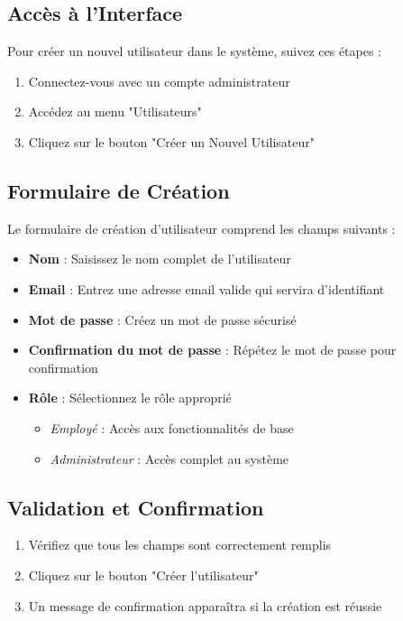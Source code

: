 \documentclass[14pt,a4paper]{report}
\begin{document}
\subsection{Accès à l'Interface}
Pour créer un nouvel utilisateur dans le système, suivez ces étapes :
\begin{enumerate}
    \item Connectez-vous avec un compte administrateur
    \item Accédez au menu "Utilisateurs"
    \item Cliquez sur le bouton "Créer un Nouvel Utilisateur"
\end{enumerate}

\subsection{Formulaire de Création}
Le formulaire de création d'utilisateur comprend les champs suivants :
\begin{itemize}
    \item \textbf{Nom} : Saisissez le nom complet de l'utilisateur
    \item \textbf{Email} : Entrez une adresse email valide qui servira d'identifiant
    \item \textbf{Mot de passe} : Créez un mot de passe sécurisé
    \item \textbf{Confirmation du mot de passe} : Répétez le mot de passe pour confirmation
    \item \textbf{Rôle} : Sélectionnez le rôle approprié
    \begin{itemize}
        \item \textit{Employé} : Accès aux fonctionnalités de base
        \item \textit{Administrateur} : Accès complet au système
    \end{itemize}
\end{itemize}

\subsection{Validation et Confirmation}
\begin{enumerate}
    \item Vérifiez que tous les champs sont correctement remplis
    \item Cliquez sur le bouton "Créer l'utilisateur"
    \item Un message de confirmation apparaîtra si la création est réussie
\end{enumerate}
\end{document}
